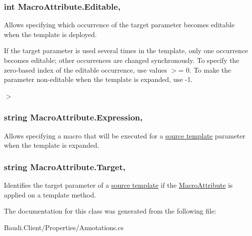 \subsubsection[{Editable}]{\setlength{\rightskip}{0pt plus 5cm}int Macro\+Attribute.\+Editable\hspace{0.3cm}{\ttfamily [get]}, {\ttfamily [set]}}\label{class_macro_attribute_a273bac2efafc085eba59752b2ea3ae58}


Allows specifying which occurrence of the target parameter becomes editable when the template is deployed. 

If the target parameter is used several times in the template, only one occurrence becomes editable; other occurrences are changed synchronously. To specify the zero-\/based index of the editable occurrence, use values $>$= 0. To make the parameter non-\/editable when the template is expanded, use -\/1. 

$>$ \hypertarget{class_macro_attribute_a172bf7385bb748baa1eb2fa931f1f9f8}{}
\subsubsection[{Expression}]{\setlength{\rightskip}{0pt plus 5cm}string Macro\+Attribute.\+Expression\hspace{0.3cm}{\ttfamily [get]}, {\ttfamily [set]}}\label{class_macro_attribute_a172bf7385bb748baa1eb2fa931f1f9f8}


Allows specifying a macro that will be executed for a \hyperlink{class_source_template_attribute}{source template} parameter when the template is expanded. 

\hypertarget{class_macro_attribute_a94502148414b928f01ad540a924846d0}{}
\subsubsection[{Target}]{\setlength{\rightskip}{0pt plus 5cm}string Macro\+Attribute.\+Target\hspace{0.3cm}{\ttfamily [get]}, {\ttfamily [set]}}\label{class_macro_attribute_a94502148414b928f01ad540a924846d0}


Identifies the target parameter of a \hyperlink{class_source_template_attribute}{source template} if the \hyperlink{class_macro_attribute}{Macro\+Attribute} is applied on a template method. 



The documentation for this class was generated from the following file\+:\begin{DoxyCompactItemize}
\item 
Baudi.\+Client/\+Properties/Annotations.\+cs\end{DoxyCompactItemize}
